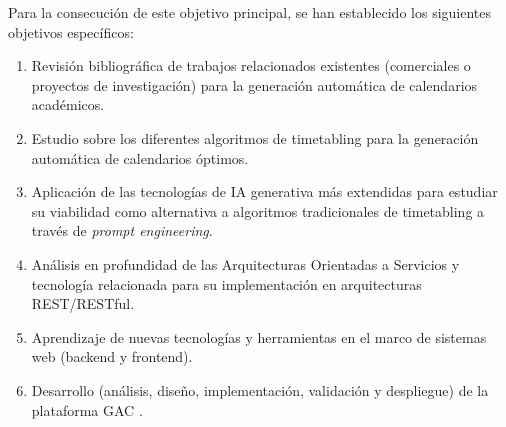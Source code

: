 Para la consecución de este objetivo principal, se han establecido los siguientes objetivos específicos:
\begin{enumerate}
    \item Revisión bibliográfica de trabajos relacionados existentes (comerciales o proyectos de investigación) para la generación automática de calendarios académicos\label{obj:1}.
    \item Estudio sobre los diferentes algoritmos de timetabling para la generación automática de calendarios óptimos\label{obj:2}.
    \item Aplicación de las tecnologías de IA generativa más extendidas para estudiar su viabilidad como alternativa a algoritmos tradicionales de timetabling a través de \textit{prompt engineering}\label{obj:3}.
    \item Análisis en profundidad de las Arquitecturas Orientadas a Servicios y tecnología relacionada para su implementación en arquitecturas REST/RESTful\label{obj:4}.
    \item Aprendizaje de nuevas tecnologías y herramientas en el marco de sistemas web (backend y frontend)\label{obj:5}.
    \item Desarrollo (análisis, diseño, implementación, validación y despliegue) de la plataforma GAC \label{obj:6}.
\end{enumerate}
